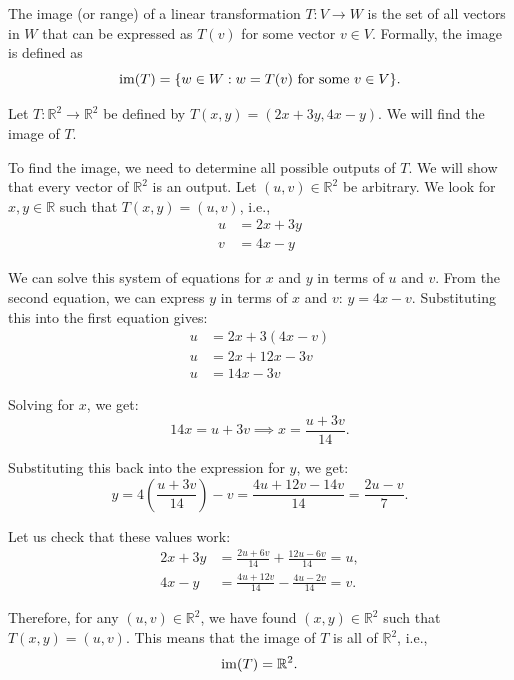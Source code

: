 \begin{definition}[Image]
    The image (or range) of a linear transformation $T: V \to W$ is the set of all vectors in $W$ that can be expressed as $T(v)$ for some vector $v \in V$. Formally, the image is defined as
    \[\operatorname{im}(T) = \{w \in W : w = T(v) \text{ for some } v \in V\}.\]
\end{definition}

\begin{example}\label{L1-ex:im1}
    Let $T: \mathbb{R}^2 \to \mathbb{R}^2$ be defined by $T(x, y) = (2x + 3y, 4x - y)$. We will find the image of $T$.

    To find the image, we need to determine all possible outputs of $T$. We will show that every vector of $\mathbb{R}^2$ is an output. Let $(u, v) \in \mathbb{R}^2$ be arbitrary. We look for $x, y \in \mathbb{R}$ such that $T(x, y) = (u, v)$, i.e.,
    \begin{align*}
        u &= 2x + 3y \\
        v &= 4x - y
    \end{align*}

    We can solve this system of equations for $x$ and $y$ in terms of $u$ and $v$. From the second equation, we can express $y$ in terms of $x$ and $v$: $y = 4x - v$. Substituting this into the first equation gives:
    \begin{align*}
        u &= 2x + 3(4x - v) \\
        u &= 2x + 12x - 3v \\
        u &= 14x - 3v
    \end{align*}

    Solving for $x$, we get:
    \[14x = u + 3v \implies x = \frac{u + 3v}{14}.\]

    Substituting this back into the expression for $y$, we get:
    \[y = 4\left(\frac{u + 3v}{14}\right) - v = \frac{4u + 12v - 14v}{14} = \frac{2u - v}{7}.\]

    Let us check that these values work:
    \begin{align*}
        2x + 3y &= \frac{2u + 6v}{14} + \frac{12u - 6v}{14} = u, \\
        4x - y &= \frac{4u + 12v}{14} - \frac{4u - 2v}{14} = v.
    \end{align*}

    Therefore, for any $(u, v) \in \mathbb{R}^2$, we have found $(x, y) \in \mathbb{R}^2$ such that $T(x, y) = (u, v)$. This means that the image of $T$ is all of $\mathbb{R}^2$, i.e.,
    \[\operatorname{im}(T) = \mathbb{R}^2.\]
\end{example}

